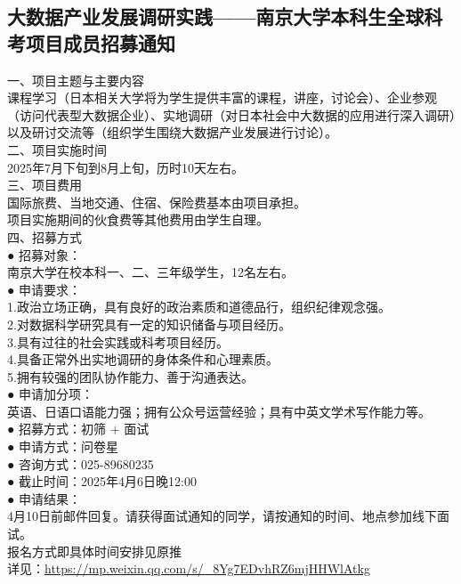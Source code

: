 \documentclass[letterpaper, 12pt]{article}
\begin{document}
\begin{multicols}{2}
\section{大数据产业发展调研实践——南京大学本科生全球科考项目成员招募通知}
一、项目主题与主要内容
\\课程学习（日本相关大学将为学生提供丰富的课程，讲座，讨论会）、企业参观（访问代表型大数据企业）、实地调研（对日本社会中大数据的应用进行深入调研）以及研讨交流等（组织学生围绕大数据产业发展进行讨论）。
\\二、项目实施时间
\\2025年7月下旬到8月上旬，历时10天左右。
\\三、项目费用
\\国际旅费、当地交通、住宿、保险费基本由项目承担。
\\项目实施期间的伙食费等其他费用由学生自理。
\\四、招募方式
\\● 招募对象：
\\南京大学在校本科一、二、三年级学生，12名左右。
\\● 申请要求：
\\1.政治立场正确，具有良好的政治素质和道德品行，组织纪律观念强。
\\2.对数据科学研究具有一定的知识储备与项目经历。
\\3.具有过往的社会实践或科考项目经历。
\\4.具备正常外出实地调研的身体条件和心理素质。
\\5.拥有较强的团队协作能力、善于沟通表达。
\\● 申请加分项：
\\英语、日语口语能力强；拥有公众号运营经验；具有中英文学术写作能力等。
\\● 招募方式：初筛 + 面试
\\● 申请方式：问卷星
\\● 咨询方式：025-89680235
\\● 截止时间：2025年4月6日晚12:00
\\● 申请结果：
\\4月10日前邮件回复。请获得面试通知的同学，请按通知的时间、地点参加线下面试。
\\报名方式即具体时间安排见原推
\\详见：\url{https://mp.weixin.qq.com/s/_8Yg7EDvhRZ6mjHHWlAtkg}


\end{multicols}
\end{document}
